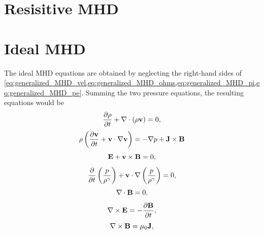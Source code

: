 \documentclass[oneside,a4paper,11pt]{report}
\begin{document}
\section{Resisitive MHD}

\section{Ideal MHD}
The ideal MHD equations are obtained by neglecting the right-hand sides of \cref{eq:generalized_MHD_vel,eq:generalized_MHD_ohms,eq:generalized_MHD_pi,eq:generalized_MHD_pe}. Summing the two pressure equations, the resulting equations would be
\begin{equation}
    \frac{\partial \rho}{\partial t} + \nabla \cdot (\rho \mathbf{v}) = 0,
\end{equation}
\begin{equation}
    \rho \left (\frac{\partial \mathbf{v}}{\partial t} + \mathbf{v} \cdot \nabla \mathbf{v} \right ) = - \nabla p  + \mathbf{J} \times \mathbf{B}
\end{equation}
\begin{equation}
    \mathbf{E} + \mathbf{v} \times \mathbf{B} = 0,
\end{equation}
\begin{equation}
    \frac{\partial}{\partial t} \left ( \frac{p}{\rho^\gamma} \right ) + \mathbf{v} \cdot \nabla \left (\frac{p}{\rho^\gamma} \right ) = 0,
\end{equation}
\begin{equation}
\nabla \cdot \mathbf{B} = 0.
\end{equation}
\begin{equation}
\nabla \times \mathbf{E} = -\frac{ \partial \mathbf{B}}{\partial t},
\end{equation}
\begin{equation}
\nabla \times \mathbf{B} = \mu_0 \mathbf{J} ,
\end{equation}
\end{document}
